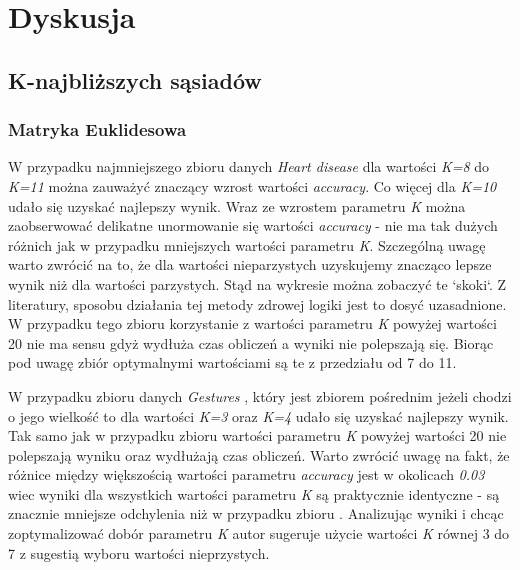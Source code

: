 \documentclass{classrep}
\begin{document}
    \section{Dyskusja}
    \label{summary} {

        \subsection{K-najbliższych sąsiadów}
        \label{knn_summary} {

            \subsubsection{Matryka Euklidesowa}
            \label{knn_summary_eucl} {

                W przypadku najmniejszego zbioru danych \textit{Heart disease}
                \cite{dataset_heart} dla wartości \textit{K=8} do \textit{K=11} można
                zauważyć znaczący wzrost wartości \textit{accuracy}. Co więcej
                dla \textit{K=10} udało się uzyskać najlepszy
                wynik. Wraz ze wzrostem parametru \textit{K} można zaobserwować delikatne
                unormowanie się wartości \textit{accuracy} - nie ma tak dużych różnich jak w przypadku
                mniejszych wartości parametru \textit{K}. Szczególną uwagę warto zwrócić na
                to, że dla wartości nieparzystych uzyskujemy znacząco lepsze wynik niż
                dla wartości parzystych. Stąd na wykresie można zobaczyć te `skoki`.
                Z literatury, sposobu działania tej metody zdrowej logiki jest to dosyć
                uzasadnione. W przypadku tego zbioru korzystanie z wartości parametru \textit{K} powyżej
                wartości 20 nie ma sensu gdyż wydłuża czas obliczeń a wyniki nie
                polepszają się.
                Biorąc pod uwagę zbiór \cite{dataset_heart} optymalnymi wartościami są te z
                przedziału od 7 do 11.

                W przypadku zbioru danych \textit{Gestures} \cite{dataset_gestures}, który
                jest zbiorem pośrednim jeżeli chodzi o jego wielkość to dla wartości
                \textit{K=3} oraz \textit{K=4} udało się uzyskać najlepszy wynik.
                Tak samo jak w przypadku zbioru \cite{dataset_heart} wartości parametru
                \textit{K} powyżej wartości 20 nie polepszają wyniku oraz wydłużają czas
                obliczeń. Warto zwrócić uwagę na fakt, że różnice między większością wartości
                parametru \textit{accuracy} jest w okolicach \textit{0.03} wiec wyniki dla
                wszystkich wartości parametru \textit{K} są praktycznie identyczne - są
                znacznie mniejsze odchylenia niż w przypadku zbioru \cite{dataset_heart}.
                Analizując wyniki i chcąc zoptymalizować dobór parametru \textit{K} autor
                sugeruje użycie wartości \textit{K} równej 3 do 7 z sugestią wyboru
                wartości nieprzystych.

}}}
\end{document}
